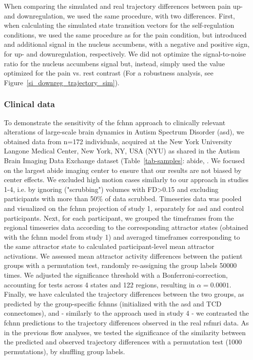 \documentclass{article}
\begin{document}
When comparing the simulated and real trajectory differences between pain up- and downregulation, we used the same procedure, with two differences. First, when calculating the simulated state transition vectors for the self-regulation conditions, we used the same procedure as for the pain condition, but introduced and additional signal in the nucleus accumbens, with a negative and positive sign, for  up- and downregulation, respectively. We did not optimize the signal-to-noise ratio for the nucleus accumbens signal but, instead, simply used the value optimized for the pain vs. rest contrast (For a robustness analysis, see Figure~\ref{si_downreg_trajectory_sim}).

\subsubsection{Clinical data}

To demonstrate the sensitivity of the \acrshort{fchnn} approach to clinically relevant alterations of large-scale brain dynamics in Autism Spectrum Disorder (\acrshort{asd}), we obtained data from n=172 individuals, acquired at the New York University Langone Medical Center, New York, NY, USA (NYU) as shared in the Autism Brain Imaging Data Exchange dataset (Table~\ref{tab-samples}: \acrshort{abide}, \citep{di2014autism}. We focused on the largest \acrshort{abide} imaging center to ensure that our results are not biased by center effects. We excluded high motion cases similarly to our approach in studies 1-4, i.e. by ignoring ("scrubbing") volumes with FD\textgreater 0.15 and excluding participants with more than 50\% of data scrubbed. Timeseries data was pooled and visualized on the \acrshort{fchnn} projection of study 1, separately for \acrshort{asd} and control participants.
Next, for each participant, we grouped the timeframes from the regional timeseries data according to the corresponding attractor states (obtained with the \acrshort{fchnn} model from study 1) and averaged timeframes corresponding to the same attractor state to calculated participant-level mean attractor activations.
We assessed mean attractor activity differences between the patient groups with a permutation test, randomly re-assigning the group labels 50000 times.
We adjusted the significance threshold with a Bonferroni-correction, accounting for tests across 4 states and 122 regions, resulting in $\alpha = 0.0001$.
Finally, we have calculated the trajectory differences between the two groups, as predicted by the group-specific \acrshort{fchnn}s (initialized with the \acrshort{asd} and TCD connectomes), and - similarly to the approach used in study 4 - we contrasted the \acrshort{fchnn} predictions to the trajectory differences observed in the real rs\acrshort{fmri} data. As in the previous flow analyses, we tested the significance of the similarity between the predicted and observed trajectory differences with a permutation test (1000 permutations), by shuffling group labels.
\printglossaries





\end{document}

